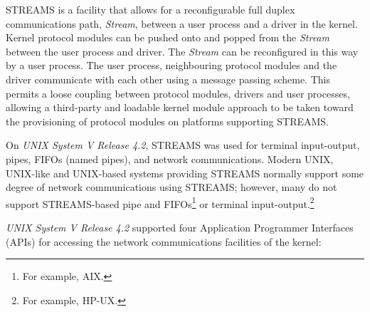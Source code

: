 \documentclass[letterpaper,final,notitlepage,twocolumn,10pt,twoside]{article}
\begin{document}
STREAMS is a facility that allows for a reconfigurable full duplex
communications path, \textit{Stream}, between a user process and a driver in
the kernel.   Kernel protocol modules can be pushed onto and popped from the
\textit{Stream} between the user process and driver.  The \textit{Stream} can
be reconfigured in this way by a user process.  The user process, neighbouring
protocol modules and the driver communicate with each other using a message
passing scheme.  This permits a loose coupling between protocol modules,
drivers and user processes, allowing a third-party and loadable kernel module
approach to be taken toward the provisioning of protocol modules on platforms
supporting STREAMS.

On \textsl{UNIX System V Release 4.2}, STREAMS was used for terminal
input-output, pipes, FIFOs (named pipes), and network communications.  Modern
UNIX, UNIX-like and UNIX-based systems providing STREAMS normally support some
degree of network communications using STREAMS; however, many do not support
STREAMS-based pipe and FIFOs\footnote{For example, AIX.} or terminal
input-output.\footnote{For example, HP-UX.}

\textsl{UNIX System V Release 4.2} supported four Application Programmer
Interfaces (APIs) for accessing the network communications facilities of the
kernel:
\end{document}
